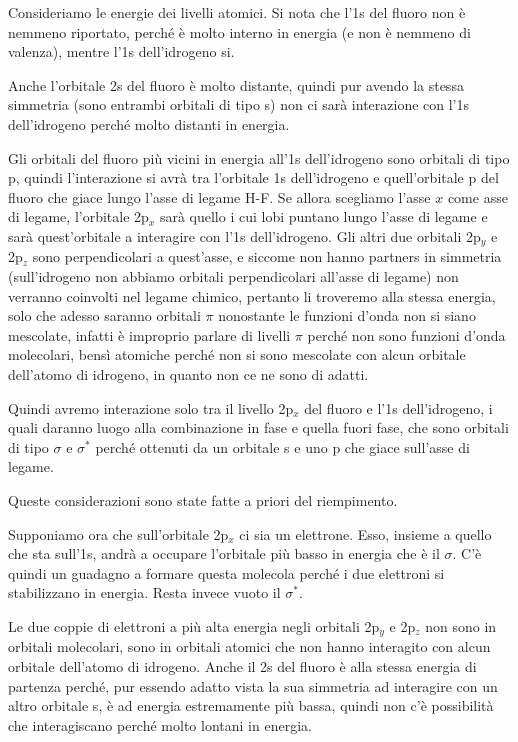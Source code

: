 Consideriamo le energie dei livelli atomici. Si nota che l'1s del fluoro non è nemmeno riportato, perché è molto interno in energia (e non è nemmeno di valenza), mentre l'1s dell'idrogeno si.

Anche l'orbitale 2s del fluoro è molto distante, quindi pur avendo la stessa simmetria (sono entrambi orbitali di tipo s) non ci sarà interazione con l'1s dell'idrogeno perché molto distanti in energia.

Gli orbitali del fluoro più vicini in energia all'1s dell'idrogeno sono orbitali di tipo p, quindi l'interazione si avrà tra l'orbitale 1s dell'idrogeno e quell'orbitale p del fluoro che giace lungo l'asse di legame H-F. Se allora scegliamo l'asse $x$ come asse di legame, l'orbitale 2p$_x$ sarà quello i cui lobi puntano lungo l'asse di legame e sarà quest'orbitale a interagire con l'1s dell'idrogeno. Gli altri due orbitali 2p$_y$ e 2p$_z$ sono perpendicolari a quest'asse, e siccome non hanno partners in simmetria (sull'idrogeno non abbiamo orbitali perpendicolari all'asse di legame) non verranno coinvolti nel legame chimico, pertanto li troveremo alla stessa energia, solo che adesso saranno orbitali $\pi$ nonostante le funzioni d'onda non si siano mescolate, infatti è improprio parlare di livelli $\pi$ perché non sono funzioni d'onda molecolari, bensì atomiche perché non si sono mescolate con alcun orbitale dell'atomo di idrogeno, in quanto non ce ne sono di adatti.

Quindi avremo interazione solo tra il livello 2p$_x$ del fluoro e l'1s dell'idrogeno, i quali daranno luogo alla combinazione in fase e quella fuori fase, che sono orbitali di tipo $\sigma$ e $\sigma^*$ perché ottenuti da un orbitale s e uno p che giace sull'asse di legame.

\vspace{0.2cm}Queste considerazioni sono state fatte a priori del riempimento.

Supponiamo ora che sull'orbitale 2p$_x$ ci sia un elettrone. Esso, insieme a quello che sta sull'1s, andrà a occupare l'orbitale più basso in energia che è il $\sigma$. C'è quindi un guadagno a formare questa molecola perché i due elettroni si stabilizzano in energia. Resta invece vuoto il $\sigma^*$.

Le due coppie di elettroni a più alta energia negli orbitali 2p$_y$ e 2p$_z$ non sono in orbitali molecolari, sono in orbitali atomici che non hanno interagito con alcun orbitale dell'atomo di idrogeno. Anche il 2s del fluoro è alla stessa energia di partenza perché, pur essendo adatto vista la sua simmetria ad interagire con un altro orbitale s, è ad energia estremamente più bassa, quindi non c'è possibilità che interagiscano perché molto lontani in energia.

